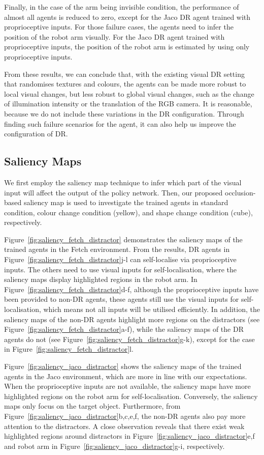 Finally, in the case of the arm being invisible condition, the performance of almost all agents is reduced to zero, except for the Jaco DR agent trained with proprioceptive inputs. For those failure cases, the agents need to infer the position of the robot arm visually. For the Jaco DR agent trained with proprioceptive inputs, the position of the robot arm is estimated by using only proprioceptive inputs.

From these results, we can conclude that, with the existing visual DR setting that randomises textures and colours, the agents can be made more robust to local visual changes, but less robust to global visual changes, such as the change of illumination intensity or the translation of the RGB camera. It is reasonable, because we do not include these variations in the DR configuration. Through finding such failure scenarios for the agent, it can also help us improve the configuration of DR.

\subsection{Saliency Maps}
We first employ the saliency map technique to infer which part of the visual input will affect the output of the policy network. Then, our proposed occlusion-based saliency map is used to investigate the trained agents in standard condition, colour change condition (yellow), and shape change condition (cube), respectively. 

Figure~\ref{fig:saliency_fetch_distractor} demonstrates the saliency maps of the trained agents in the Fetch environment. From the results, DR agents in Figure~\ref{fig:saliency_fetch_distractor}j-l can self-localise via proprioceptive inputs. The others need to use visual inputs for self-localisation, where the saliency maps display highlighted regions in the robot arm. In Figure~\ref{fig:saliency_fetch_distractor}d-f, although the proprioceptive inputs have been provided to non-DR agents, these agents still use the visual inputs for self-localisation, which means not all inputs will be utilised efficiently. In addition, the saliency maps of the non-DR agents highlight more regions on the distractors (see Figure~\ref{fig:saliency_fetch_distractor}a-f), while the saliency maps of the DR agents do not (see Figure~\ref{fig:saliency_fetch_distractor}g-k), except for the case in Figure~\ref{fig:saliency_fetch_distractor}l. 

Figure~\ref{fig:saliency_jaco_distractor} shows the saliency maps of the trained agents in the Jaco environment, which are more in line with our expectations. When the proprioceptive inputs are not available, the saliency maps have more highlighted regions on the robot arm for self-localisation. Conversely, the saliency maps only focus on the target object. Furthermore, from Figure~\ref{fig:saliency_jaco_distractor}b,c,e,f, the non-DR agents also pay more attention to the distractors. A close observation reveals that there exist weak highlighted regions around distractors in Figure~\ref{fig:saliency_jaco_distractor}e,f and robot arm in  Figure~\ref{fig:saliency_jaco_distractor}g-i, respectively.

